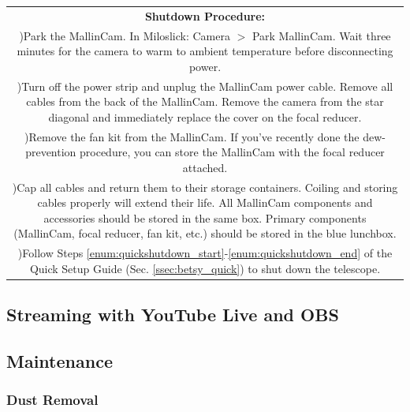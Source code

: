 \documentclass[12pt,titlepage]{article}
\newcounter{rowcount}
\newcommand{\step}{\stepcounter{rowcount}\therowcount)\hspace*{\tabcolsep}}
\begin{document}
\begin{longtable}{c}
	\textbf{Shutdown Procedure:}\\    
	
	    \multicolumn{1}{m{\textwidth}}{\step Park the MallinCam. In Miloslick: Camera $>$ Park MallinCam. Wait three minutes for the camera to warm to ambient temperature before disconnecting power.} \\
	    
	    \multicolumn{1}{m{\textwidth}}{\step Turn off the power strip and unplug the MallinCam power cable. Remove all cables from the back of the MallinCam. Remove the camera from the star diagonal and immediately replace the cover on the focal reducer.} \\
	    
	   \multicolumn{1}{m{\textwidth}}{\step Remove the fan kit from the MallinCam. If you've recently done the dew-prevention procedure, you can store the MallinCam with the focal reducer attached.} \\
	    
    \multicolumn{1}{m{\textwidth}}{\step Cap all cables and return them to their storage containers. Coiling and storing cables properly will extend their life. All MallinCam components and accessories should be stored in the same box. Primary components (MallinCam, focal reducer, fan kit, etc.) should be stored in the blue lunchbox.} \\
    
    \multicolumn{1}{m{\textwidth}}{\step Follow Steps \ref{enum:quickshutdown_start}-\ref{enum:quickshutdown_end} of the Quick Setup Guide (Sec. \ref{ssec:betsy_quick}) to shut down the telescope.} \\
\end{longtable}
\setcounter{rowcount}{0}

\subsection{Streaming with YouTube Live and OBS}
\subsection{Maintenance}
\subsubsection{Dust Removal} \label{sssec:dust}
\end{document}
